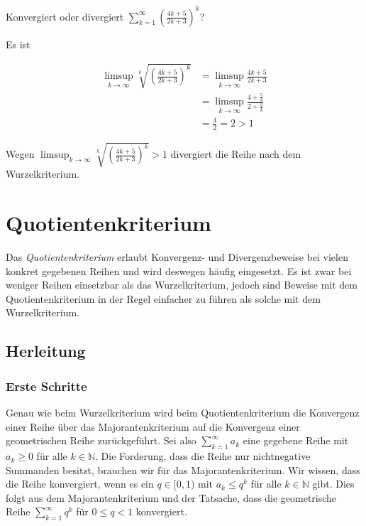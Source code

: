 \documentclass[fontsize=9pt,
               parskip=half-,
               DIV=14,
               listof=chapterentry,
               tocflat]{scrbook}
\begin{document}
\begin{exercise*}
Konvergiert oder divergiert $\sum _{k=1}^{\infty }\left({\frac {4k+5}{2k+3}}\right)^{k}$?

\end{exercise*}

\begin{solution*}
Es ist

\begin{align*}
\limsup _{k\to \infty }{\sqrt[{k}]{\left({\frac {4k+5}{2k+3}}\right)^{k}}}&=\limsup _{k\to \infty }{\frac {4k+5}{2k+3}}\\[0.5em]&=\limsup _{k\to \infty }{\frac {4+{\frac {5}{k}}}{2+{\frac {3}{k}}}}\\[0.5em]&={\frac {4}{2}}=2>1
\end{align*}

Wegen $\limsup _{k\to \infty }{\sqrt[{k}]{\left({\frac {4k+5}{2k+3}}\right)^{k}}}>1$ divergiert die Reihe nach dem Wurzelkriterium.

\end{solution*}



\chapter{Quotientenkriterium}

Das \emph{Quotientenkriterium} erlaubt Konvergenz- und Divergenzbeweise bei vielen konkret gegebenen Reihen und wird deswegen häufig eingesetzt. Es ist zwar bei weniger Reihen einsetzbar als das Wurzelkriterium, jedoch sind Beweise mit dem Quotientenkriterium in der Regel einfacher zu führen als solche mit dem Wurzelkriterium.



\section{Herleitung}

\subsection{Erste Schritte}

Genau wie beim Wurzelkriterium wird beim Quotientenkriterium die Konvergenz einer Reihe über das Majorantenkriterium auf die Konvergenz einer geometrischen Reihe zurückgeführt. Sei also $\sum _{k=1}^{\infty }a_{k}$ eine gegebene Reihe mit $a_{k}\geq 0$ für alle $k\in \mathbb {N} $. Die Forderung, dass die Reihe nur nichtnegative Summanden besitzt, brauchen wir für das Majorantenkriterium. Wir wissen, dass die Reihe konvergiert, wenn es ein $q\in [0,1)$ mit $a_{k}\leq q^{k}$ für alle $k\in \mathbb {N} $ gibt. Dies folgt aus dem Majorantenkriterium und der Tatsache, dass die geometrische Reihe $\sum _{k=1}^{\infty }q^{k}$ für $0\leq q<1$ konvergiert.
\end{document}
